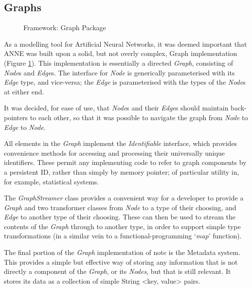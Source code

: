 \documentclass{acm_proc_article-sp}
\begin{document}
\subsection{Graphs}
{
\begin{figure}[t]
\centering
{}
\caption{Framework: Graph Package}
\label{fig:framework:graph}
\end{figure}
As a modelling tool for Artificial Neural Networks, it was deemed important that ANNE was built upon a solid, but not overly complex, Graph implementation (Figure \ref{fig:framework:graph}). This implementation is essentially a directed {\textit{Graph}}, consisting of {\textit{Node}}s and {\textit{Edge}}s. The interface for {\textit{Node}} is generically parameterised with its {\textit{Edge}} type, and vice{}-versa; the {\textit{Edge}} is parameterised with the types of the {\textit{Node}}s at either end.

It was decided, for ease of use, that {\textit{Node}}s and their {\textit{Edge}}s should maintain back{}-pointers to each other, so that it was possible to navigate the graph from {\textit{Node}} to {\textit{Edge}} to {\textit{Node}}.

All elements in the {\textit{Graph}} implement the {\textit{Identifiable}} interface, which provides convenience methods for accessing and processing their universally unique identifiers. These permit any implementing code to refer to graph components by a persistent ID, rather than simply by memory pointer; of particular utility in, for example, statistical systems.

The {\textit{GraphStreamer}} class provides a convenient way for a developer to provide a {\textit{Graph}} and two transformer classes from {\textit{Node}} to a type of their choosing, and {\textit{Edge}} to another type of their choosing. These can then be used to stream the contents of the {\textit{Graph}} through to another type, in order to support simple type transformations (in a similar vein to a functional{}-programming `{\textit{map}}' function).

The final portion of the {\textit{Graph}} implementation of note is the Metadata system. This provides a simple but effective way of storing any information that is not directly a component of the {\textit{Graph}}, or its {\textit{Nodes}}, but that is still relevant. It stores its data as a collection of simple String \textless key, value\textgreater{} pairs.
}
\end{document}
